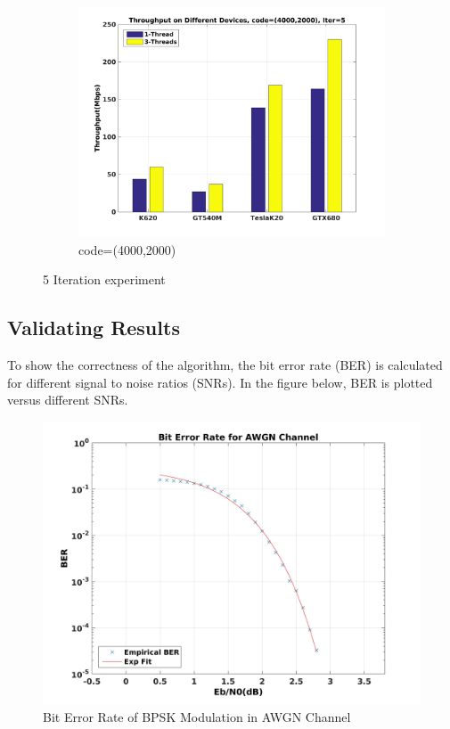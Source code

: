 \documentclass{article}
\begin{document}
\begin{figure}[H]
\begin{subfigure}[b]{0.7\textwidth}
    \includegraphics[width=\textwidth]{c_4k_5.jpg}
    \caption{code=(4000,2000)}
    \label{fig:throu_5_c}
  \end{subfigure}
  \caption{5 Iteration experiment}\label{fig:5iter}
\end{figure}

\subsection{Validating Results}
To show the correctness of the algorithm, the bit error rate (BER) is calculated for different signal to noise ratios (SNRs). In the figure below, BER is plotted versus different SNRs.

\begin{figure}[H]
\begin{centering}
\includegraphics[scale=0.1]{BER.jpg}
\caption[width=.5\textwidth]{Bit Error Rate of BPSK Modulation in AWGN Channel}\label{fig::ber}
\end{centering}
\end{figure}
\end{document}
